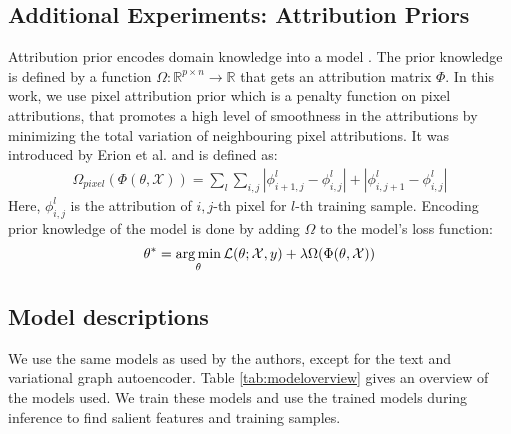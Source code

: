 \subsection{Additional Experiments: Attribution Priors}
\label{sec:attrprior}
Attribution prior encodes domain knowledge into a model \citep{attrprior}. The prior knowledge is defined by a function $\Omega:\mathbb{R}^{p\times n}\rightarrow\mathbb{R}$ that gets an attribution matrix $\Phi$. In this work, we use pixel attribution prior which is a penalty function on pixel attributions, that promotes a high level of smoothness in the attributions by minimizing the total variation of neighbouring pixel attributions. It was introduced by Erion et al. \citep{attrprior} and is defined as:
\begin{align}\label{eqn:pixelattrprior}
    \Omega_{pixel}(\Phi(\theta,\mathcal{X})) = \sum_{l}\sum_{i,j}{|\phi_{i+1,j}^l-\phi_{i,j}^l|+|\phi_{i,j+1}^l-\phi_{i,j}^l|}
\end{align}
Here, $\phi_{i,j}^l$ is the attribution of $i,j$-th pixel for $l$-th training sample. Encoding prior knowledge of the model is done by adding $\Omega$ to the model's loss function:
\begin{align}\label{eqn:losswithattrprior}
\theta^* = \operatorname*{arg\,min}_\theta \mathcal{L}(\theta; \mathcal{X}, y)+ \lambda\Omega(\Phi(\theta, \mathcal{X}))
\end{align}
\subsection{Model descriptions}
\label{model_descriptions}
We use the same models as used by the authors, except for the text and variational graph autoencoder. Table \ref{tab:modeloverview} gives an overview of the models used. We train these models and use the trained models during inference to find salient features and training samples.


